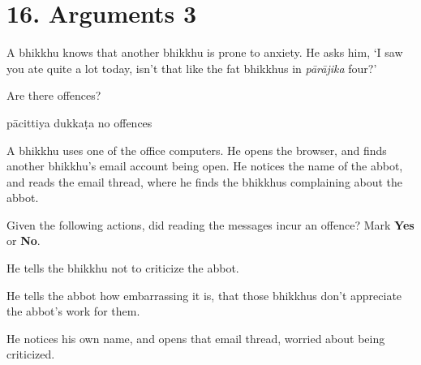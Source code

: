 \chapter{16. Arguments 3}
\renewcommand*{\theChapterTitle}{16. Arguments 3}

\begin{exam}{\autoExamName}

  \begin{problem}

    A bhikkhu knows that another bhikkhu is prone to anxiety. He asks him, `I
    saw you ate quite a lot today, isn't that like the fat bhikkhus in
    \textit{pārājika} four?'

    Are there offences?

    \bigskip

    \begin{answers}{3}
      \bChoices
       pācittiya\eAns
       dukkaṭa\eAns
       no offences\eAns
      \eChoices
    \end{answers}

  \end{problem}

  \problemDivide

  \begin{problem*}

    A bhikkhu uses one of the office computers. He opens the browser, and finds
    another bhikkhu's email account being open. He notices the name of the
    abbot, and reads the email thread, where he finds the bhikkhus complaining
    about the abbot.

    \bigskip

    Given the following actions, did reading the messages incur an offence? Mark \textbf{Yes} or \textbf{No}.

    \bigskip

      \begin{parts}
      \item {} He tells the bhikkhu not to criticize the abbot.

      \item {} He tells the abbot how embarrassing it is, that those
        bhikkhus don't appreciate the abbot's work for them.
        
      \item {} He notices his own name, and opens that email thread, worried
        about being criticized.
      \end{parts}

  \end{problem*}


\end{exam}
